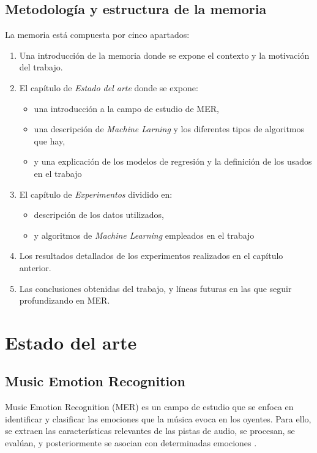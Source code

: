 \documentclass[12pt,a4paper,Spanish]{article}
\begin{document}
\subsection{Metodología y estructura de la memoria}
La memoria está compuesta por cinco apartados:
\begin{enumerate}
	\item Una introducción de la memoria donde se expone el contexto y la motivación del trabajo.
	\item El capítulo de \textit{Estado del arte} donde se expone:
	\begin{itemize}
		\item una introducción a la campo de estudio de MER,
		\item una descripción de \textit{Machine Larning} y los diferentes tipos de algoritmos que hay, 
		\item y una explicación de los modelos de regresión y la definición de los usados en el trabajo
	\end{itemize}
	\item El capítulo de \textit{Experimentos} dividido en:
	\begin{itemize}
		\item descripción de los datos utilizados,
		\item y algoritmos de \textit{Machine Learning} empleados en el trabajo
	\end{itemize}
	\item Los resultados detallados de los experimentos realizados en el capítulo anterior.
	\item Las conclusiones obtenidas del trabajo, y líneas futuras en las que seguir profundizando en MER.
\end{enumerate}









\newpage
\section{Estado del arte}
\subsection{Music Emotion Recognition}

Music Emotion Recognition (MER) es un campo de estudio que se enfoca en identificar y clasificar las emociones que la música evoca en los oyentes. Para ello, se extraen las características relevantes de las pistas de audio, se procesan, se evalúan, y posteriormente se asocian con determinadas emociones \cite{GomezCanon2021SPM}.
\newline
\end{document}
